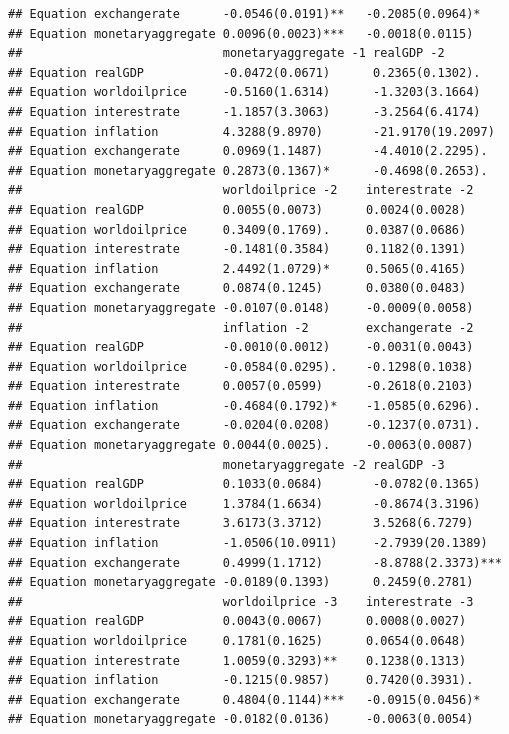 \documentclass[11pt,preprint, authoryear]{elsarticle}
\numberwithin{equation}{section}
\numberwithin{figure}{section}
\numberwithin{table}{section}
\begin{document}
\begin{verbatim}
## Equation exchangerate      -0.0546(0.0191)**   -0.2085(0.0964)*   
## Equation monetaryaggregate 0.0096(0.0023)***   -0.0018(0.0115)    
##                            monetaryaggregate -1 realGDP -2           
## Equation realGDP           -0.0472(0.0671)      0.2365(0.1302).      
## Equation worldoilprice     -0.5160(1.6314)      -1.3203(3.1664)      
## Equation interestrate      -1.1857(3.3063)      -3.2564(6.4174)      
## Equation inflation         4.3288(9.8970)       -21.9170(19.2097)    
## Equation exchangerate      0.0969(1.1487)       -4.4010(2.2295).     
## Equation monetaryaggregate 0.2873(0.1367)*      -0.4698(0.2653).     
##                            worldoilprice -2    interestrate -2    
## Equation realGDP           0.0055(0.0073)      0.0024(0.0028)     
## Equation worldoilprice     0.3409(0.1769).     0.0387(0.0686)     
## Equation interestrate      -0.1481(0.3584)     0.1182(0.1391)     
## Equation inflation         2.4492(1.0729)*     0.5065(0.4165)     
## Equation exchangerate      0.0874(0.1245)      0.0380(0.0483)     
## Equation monetaryaggregate -0.0107(0.0148)     -0.0009(0.0058)    
##                            inflation -2        exchangerate -2    
## Equation realGDP           -0.0010(0.0012)     -0.0031(0.0043)    
## Equation worldoilprice     -0.0584(0.0295).    -0.1298(0.1038)    
## Equation interestrate      0.0057(0.0599)      -0.2618(0.2103)    
## Equation inflation         -0.4684(0.1792)*    -1.0585(0.6296).   
## Equation exchangerate      -0.0204(0.0208)     -0.1237(0.0731).   
## Equation monetaryaggregate 0.0044(0.0025).     -0.0063(0.0087)    
##                            monetaryaggregate -2 realGDP -3          
## Equation realGDP           0.1033(0.0684)       -0.0782(0.1365)     
## Equation worldoilprice     1.3784(1.6634)       -0.8674(3.3196)     
## Equation interestrate      3.6173(3.3712)       3.5268(6.7279)      
## Equation inflation         -1.0506(10.0911)     -2.7939(20.1389)    
## Equation exchangerate      0.4999(1.1712)       -8.8788(2.3373)***  
## Equation monetaryaggregate -0.0189(0.1393)      0.2459(0.2781)      
##                            worldoilprice -3    interestrate -3    
## Equation realGDP           0.0043(0.0067)      0.0008(0.0027)     
## Equation worldoilprice     0.1781(0.1625)      0.0654(0.0648)     
## Equation interestrate      1.0059(0.3293)**    0.1238(0.1313)     
## Equation inflation         -0.1215(0.9857)     0.7420(0.3931).    
## Equation exchangerate      0.4804(0.1144)***   -0.0915(0.0456)*   
## Equation monetaryaggregate -0.0182(0.0136)     -0.0063(0.0054)    

\end{verbatim}
\end{document}
